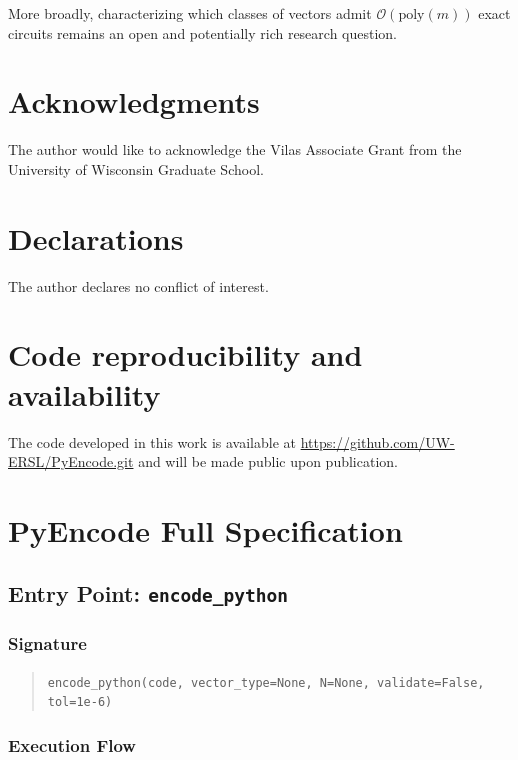 \documentclass[10pt,twocolumn]{article}
\newcommand{\bigO}[1]{\mathcal{O}(#1)}
\begin{document}
More broadly, characterizing which classes of vectors admit $\bigO{\mathrm{poly}(m)}$ exact circuits remains an open and potentially rich research question.



\section*{Acknowledgments}
The author would like to acknowledge the Vilas Associate Grant from the University of Wisconsin Graduate School.

\section*{Declarations}
The author declares no conflict of interest.

\section*{Code reproducibility and availability }

The code developed in this work is available at \url{https://github.com/UW-ERSL/PyEncode.git}
and will be made public upon publication.




\appendix
\section{PyEncode Full Specification}
\label{sec:Appendix}

\subsection{Entry Point: \texttt{encode\_python}}
\label{app:encode_python}

\subsubsection*{Signature}

\begin{quote}
\texttt{encode\_python(code, vector\_type=None, N=None, validate=False, tol=1e-6)}
\end{quote}

\subsubsection*{Execution Flow}
\end{document}
